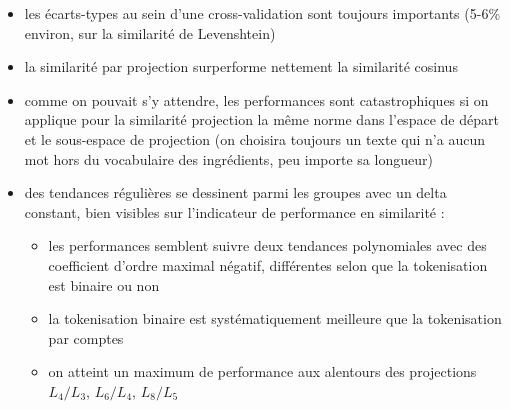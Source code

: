             \begin{itemize}
                \item les écarts-types au sein d'une cross-validation sont toujours importants (5-6\% environ, sur la similarité de Levenshtein)
                \item la similarité par projection surperforme nettement la similarité cosinus
                \item comme on pouvait s'y attendre, les performances sont catastrophiques si on applique pour la similarité projection la même norme dans l'espace de départ et le sous-espace de projection (on choisira toujours un texte qui n'a aucun mot hors du vocabulaire des ingrédients, peu importe sa longueur)
                \item des tendances régulières se dessinent parmi les groupes avec un delta constant, bien visibles sur l'indicateur de performance en similarité : 
                \begin{itemize}
                    \item les performances semblent suivre deux tendances polynomiales avec des coefficient d'ordre maximal négatif, différentes selon que la tokenisation est binaire ou non
                    \item la tokenisation binaire est systématiquement meilleure que la tokenisation par comptes
                    \item on atteint un maximum de performance aux alentours des projections $L_{4}/L_{3}$, $L_{6}/L_{4}$, $L_{8}/L_{5}$
                \end{itemize}
            \end{itemize}

